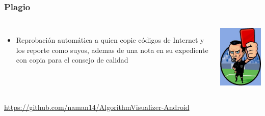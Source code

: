 \documentclass[aspectratio=169]{beamer}
\begin{document}
\begin{frame}
\frametitle{Plagio}
\begin{columns}[c] %
\begin{itemize}
\item Reprobación automática a quien copie códigos de Internet y los reporte como suyos, ademas de una nota en su expediente con copia para el consejo de calidad 
\end{itemize}
\begin{center}
\includegraphics[scale=0.27]{tarjeta-roja}
\end{center}
\end{columns}
\href{https://github.com/naman14/AlgorithmVisualizer-Android}{https://github.com/naman14/AlgorithmVisualizer-Android}


\end{frame}
\end{document}
